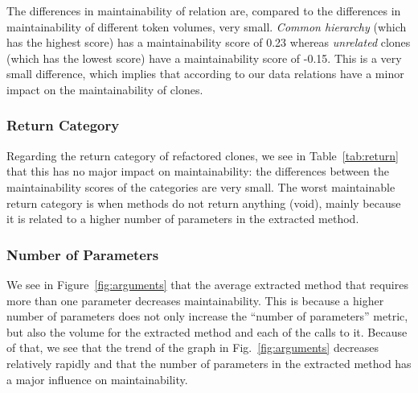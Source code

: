 The differences in maintainability of relation are, compared to the differences in maintainability of different token volumes, very small. \textit{Common hierarchy} (which has the highest score) has a maintainability score of 0.23 whereas \textit{unrelated} clones (which has the lowest score) have a maintainability score of -0.15. This is a very small difference, which implies that according to our data relations have a minor impact on the maintainability of clones.

\subsubsection{Return Category}
Regarding the return category of refactored clones, we see in Table~\ref{tab:return} that this has no major impact on maintainability: the differences between the maintainability scores of the categories are very small. The worst maintainable return category is when methods do not return anything (void), mainly because it is related to a higher number of parameters in the extracted method.

\subsubsection{Number of Parameters}
We see in Figure~\ref{fig:arguments} that the average extracted method that requires more than one parameter decreases maintainability. This is because a higher number of parameters does not only increase the ``number of parameters'' metric, but also the volume for the extracted method and each of the calls to it. Because of that, we see that the trend of the graph in Fig.~\ref{fig:arguments} decreases relatively rapidly and that the number of parameters in the extracted method has a major influence on maintainability.
